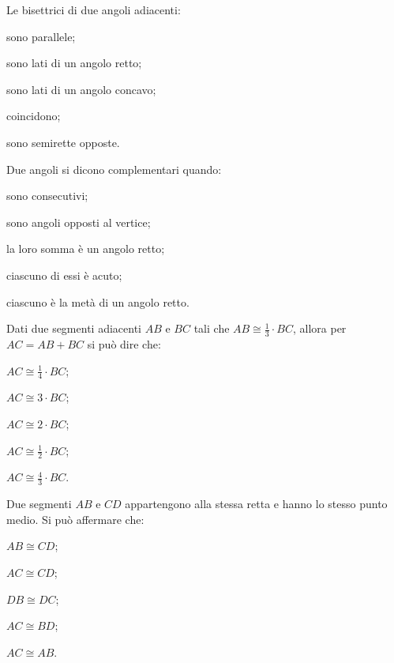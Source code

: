 \begin{esercizio}
\label{ese:1.69}
Le bisettrici di due angoli adiacenti:
\begin{multicols}{2}
\begin{enumeratea}
\item sono parallele;
\item sono lati di un angolo retto;
\item sono lati di un angolo concavo;
\item coincidono;
\item sono semirette opposte.
\end{enumeratea}
\end{multicols}
\end{esercizio}

\begin{esercizio}
\label{ese:1.70}
Due angoli si dicono complementari quando:
\begin{multicols}{2}
\begin{enumeratea}
\item sono consecutivi;
\item sono angoli opposti al vertice;
\item la loro somma è un angolo retto;
\item ciascuno di essi è acuto;
\item ciascuno è la metà di un angolo retto.
\end{enumeratea}
\end{multicols}
\end{esercizio}

\begin{esercizio}
\label{ese:1.71}
Dati due segmenti adiacenti $AB$ e $BC$ tali che $AB\cong 
\frac{1}{3}\cdot BC$, allora per $AC=AB+BC$ si può dire che:
\begin{multicols}{3}
\begin{enumeratea}
\item $AC\cong \frac{1}{4}\cdot BC$;
\item $AC\cong 3\cdot BC$;
\item $AC\cong 2\cdot BC$;
\item $AC\cong \frac{1}{2}\cdot BC$;
\item $AC\cong \frac{4}{3}\cdot BC$.
\end{enumeratea}
\end{multicols}
\end{esercizio}

\begin{esercizio}
\label{ese:1.72}
Due segmenti $AB$ e $CD$ appartengono alla stessa retta e hanno lo 
stesso punto medio. Si può affermare che:
\begin{multicols}{5}
\begin{enumeratea}
\item $AB\cong CD$;
\item $AC\cong CD$;
\item $DB\cong DC$;
\item $AC\cong BD$;
\item $AC\cong AB$.
\end{enumeratea}
\end{multicols}
\end{esercizio}

